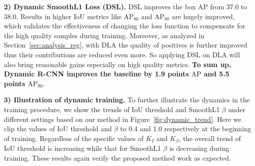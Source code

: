 \documentclass[runningheads]{llncs}
\begin{document}
\noindent
\textbf{2) Dynamic SmoothL1 Loss (DSL).}
DSL improves the box AP from 37.0 to 38.0. Results in higher IoU metrics like $\mathrm{AP}_{80}$ and $\mathrm{AP}_{90}$ are hugely improved, which validates the effectiveness of changing the loss function to compensate for the high quality samples during training. Moreover, as analyzed in Section~\ref{sec:analysis_reg}, with DLA the quality of positives is further improved thus their contributions are reduced even more. So applying DSL on DLA will also bring reasonable gains especially on high quality metrics. \textbf{To sum up, Dynamic R-CNN improves the baseline by 1.9 points $\mathrm{AP}$ and 5.5 points $\mathrm{AP_{90}}$}.

\noindent
\textbf{3) Illustration of dynamic training.}
To further illustrate the dynamics in the training procedure, we show the trends of IoU threshold and SmoothL1 $\beta$ under different settings based on our method in Figure~\ref{fig:dynamic_trend}. Here we clip the values of IoU threshold and $\beta$ to 0.4 and 1.0 respectively at the beginning of training.
Regardless of the specific values of $K_I$ and $K_\beta$, the overall trend of IoU threshold is increasing while that for SmoothL1 $\beta$ is decreasing during training. These results again verify the proposed method work as expected.
\end{document}
